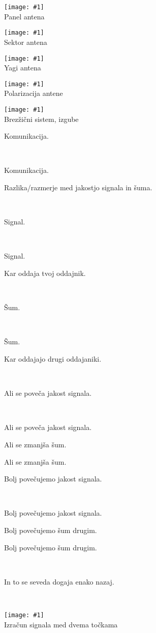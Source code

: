 \documentclass[]{beamer}
\newcommand{\ifstrempty}[3]{%
\def\reallyempty{}%
\def\ifarg{#1}%
\ifx\ifarg\reallyempty%
{#2}
\else
{#3}
\fi%
}
\newcommand{\wrapframe}[1]{
\begin{frame}
 #1
\end{frame}
}
\newcommand{\simpleslide}[3]{\wrapframe{
\ifstrempty{#1}{\vbox{ \ } 

}{
{\footnotesize #1}
} \vfill

\begin{center}
#2
\end{center}
\vfill
\ifstrempty{#3}{ \ }{
\begin{flushright}
{\footnotesize #3}
\end{flushright}
}
}}
\newcommand{\simpleslideimage}[2]{\wrapframe{
\begin{center}
\texttt{[image: \#1]}
\\ {\footnotesize #2}
\end{center}}
}
\begin{document}
\simpleslideimage{images/PanelPattern.png}{Panel antena}

\simpleslideimage{images/SectorPattern.png}{Sektor antena}

\simpleslideimage{images/YagiPattern.png}{Yagi antena}

\simpleslideimage{images/Polarization.png}{Polarizacija antene}

\simpleslideimage{images/LinkLoss.png}{Brezžični sistem, izgube}

\simpleslide{Komunikacija.}{Razlika/razmerje med jakostjo signala in šuma.}{}

\simpleslide{Signal.}{Kar oddaja tvoj oddajnik.}{}

\simpleslide{Šum.}{Kar oddajajo drugi oddajaniki.}{}

\simpleslide{Ali se poveča jakost signala.}{}{Ali se zmanjša šum.}

\simpleslide{Bolj povečujemo jakost signala.}{}{Bolj povečujemo šum drugim.}

\simpleslide{}{In to se seveda dogaja enako nazaj.}{}

\simpleslideimage{images/DrugaLink.png}{Izračun signala med dvema točkama}
\end{document}
